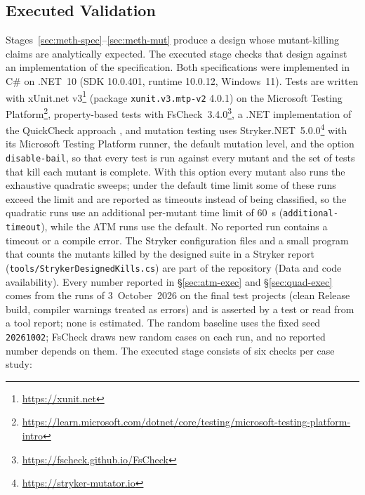 \documentclass[11pt,a4paper]{article}
\begin{document}
\subsection{Executed Validation}
\label{sec:exec-method}
Stages~\ref{sec:meth-spec}--\ref{sec:meth-mut} produce a design whose
mutant-killing claims are analytically expected. The executed stage checks
that design against an implementation of the specification. Both
specifications were implemented in C\# on .NET~10 (SDK 10.0.401, runtime
10.0.12, Windows~11). Tests are written with xUnit.net
v3\footnote{\url{https://xunit.net}} (package \texttt{xunit.v3.mtp-v2}
4.0.1) on the Microsoft Testing
Platform\footnote{\url{https://learn.microsoft.com/dotnet/core/testing/microsoft-testing-platform-intro}},
property-based tests with FsCheck~3.4.0\footnote{\url{https://fscheck.github.io/FsCheck}},
a .NET implementation of the QuickCheck approach \cite{claessen2000}, and mutation
testing uses Stryker.NET~5.0.0\footnote{\url{https://stryker-mutator.io}} with
its Microsoft Testing Platform runner, the default mutation level, and the
option \texttt{disable-bail}, so that every test is run against every mutant
and the set of tests that kill each mutant is complete. With this option
every mutant also runs the exhaustive quadratic sweeps; under the default
time limit some of these runs exceed the limit and are reported as timeouts
instead of being classified, so the quadratic runs use an additional
per-mutant time limit of 60~s (\texttt{additional-timeout}), while the ATM
runs use the default. No reported run contains a timeout or a compile
error. The Stryker configuration files and a small program that counts the
mutants killed by the designed suite in a Stryker report
(\texttt{tools/StrykerDesignedKills.cs}) are part of the repository (Data
and code availability). Every number reported in
\S\ref{sec:atm-exec} and \S\ref{sec:quad-exec} comes from the runs of
3~October~2026 on the final test projects (clean Release build, compiler
warnings treated as errors) and is asserted by a test or read from a tool
report; none is estimated. The random baseline uses the fixed seed
\texttt{20261002}; FsCheck draws new random cases on each run, and no
reported number depends on them. The executed stage consists of six checks
per case study:
\end{document}
